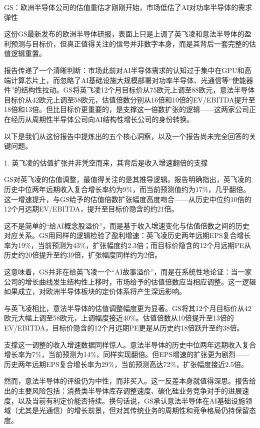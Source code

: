 \documentclass[11pt]{ctexart}
\begin{document}
GS：欧洲半导体公司的估值重估才刚刚开始，市场低估了AI对功率半导体的需求弹性

这份GS最新发布的欧洲半导体研报，表面上只是上调了英飞凌和意法半导体的盈利预测与目标价，但真正值得关注的信号并非数字本身，而是其背后一套完整的估值逻辑重置。

报告传递了一个清晰判断：市场此前对AI半导体需求的认知过于集中在GPU和高端计算芯片上，而忽略了AI基础设施大规模部署对功率半导体、光通信等“使能器件”的结构性拉动。GS将英飞凌12个月目标价从75欧元上调至88欧元，意法半导体目标价从42欧元上调至58欧元，估值倍数分别从16倍和10倍的EV/EBITDA提升至18倍和13倍。但比目标价更重要的，是支撑这一倍数扩张的逻辑——这两家公司正在经历从周期性半导体公司向AI结构性增长公司的身份转换。

以下是我们从这份报告中提炼出的五个核心洞察，以及一个报告尚未完全回答的关键问题。

1. 英飞凌的估值扩张并非凭空而来，其背后是收入增速翻倍的支撑

GS对英飞凌的估值调整，最值得关注的是其推导逻辑。报告明确指出，英飞凌的历史中位两年远期收入复合增长率约为9\%，而当前预测值约为17\%，几乎翻倍。这一增速提升，与GS给予的估值倍数扩张幅度高度吻合——从历史中位约10倍的12个月远期EV/EBITDA，提升至目标价隐含的约21倍。

这不是简单的“给AI概念股溢价”，而是基于收入增速变化与估值倍数之间的历史对应关系。GS用同样的逻辑检验了盈利增速：英飞凌历史两年远期EPS复合增长率为19\%，当前预测为43\%，扩张幅度约2.3倍；而目标价隐含的12个月远期PE从历史约20倍提升至约39倍，扩张幅度同样约为2倍。

这意味着，GS并非在给英飞凌一个“AI故事溢价”，而是在系统性地论证：当一家公司的增长曲线发生结构性上移时，市场给予的估值倍数应当相应调整。这一逻辑如果成立，对欧洲半导体板块的定价体系将产生深远影响。

与英飞凌相比，意法半导体的估值调整幅度更为显著。GS将其12个月目标价从42欧元大幅上调至58欧元，上调幅度接近40\%。估值倍数从10倍提升至13倍的EV/EBITDA，目标价隐含的12个月远期PE更是从历史约18倍跃升至约38倍。

支撑这一调整的收入增速数据同样惊人。意法半导体的历史中位两年远期收入复合增长率为7\%，当前预测为14\%，同样实现翻倍。但EPS增速的扩张更为剧烈——历史两年远期EPS复合增长率为29\%，当前预测高达72\%，扩张幅度接近2.5倍。

然而，意法半导体的评级仍为中性，而非买入。这一反差本身就值得深思。报告给出的主要风险包括：消费类半导体库存调整速度、碳化硅业务竞争对手的进展速度，以及当前有利定价能否持续。换句话说，GS承认意法半导体在AI基础设施领域（尤其是光通信）的增长前景，但对其传统业务的周期性和竞争格局仍持保留态度。
\end{document}

